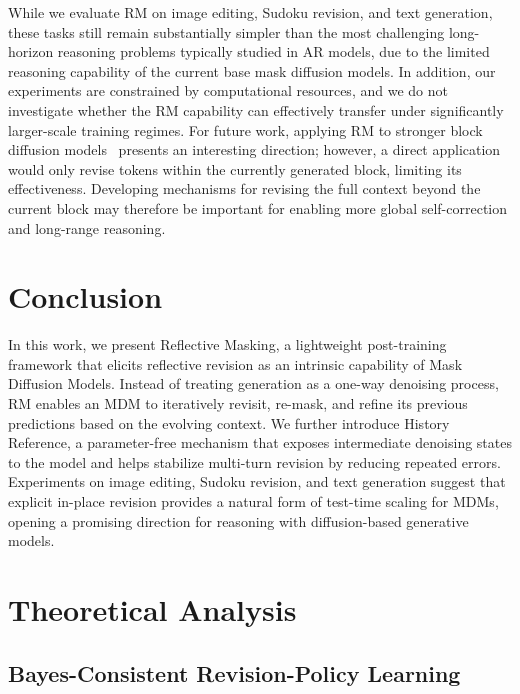 \documentclass{llmxive}
\providecommand{\methodfull}{Reflective Masking\xspace}
\providecommand{\method}{RM\xspace}
\begin{document}
While we evaluate \method on image editing, Sudoku revision, and text generation, these tasks still remain substantially simpler than the most challenging long-horizon reasoning problems typically studied in AR models, due to the limited reasoning capability of the current base mask diffusion models. In addition, our experiments are constrained by computational resources, and we do not investigate whether the \method capability can effectively transfer under significantly larger-scale training regimes. For future work, applying \method to stronger block diffusion models~\citep{arriola2025block,cheng2025sdar,bie2025llada2} presents an interesting direction; however, a direct application would only revise tokens within the currently generated block, limiting its effectiveness. Developing mechanisms for revising the full context beyond the current block may therefore be important for enabling more global self-correction and long-range reasoning.

\section{Conclusion}
\label{sec:conclusion}

In this work, we present \methodfull, a lightweight post-training framework that elicits reflective revision as an intrinsic capability of Mask Diffusion Models. Instead of treating generation as a one-way denoising process, \method enables an MDM to iteratively revisit, re-mask, and refine its previous predictions based on the evolving context. We further introduce History Reference, a parameter-free mechanism that exposes intermediate denoising states to the model and helps stabilize multi-turn revision by reducing repeated errors. Experiments on image editing, Sudoku revision, and text generation suggest that explicit in-place revision provides a natural form of test-time scaling for MDMs, opening a promising direction for reasoning with diffusion-based generative models.





\appendix

\section{Theoretical Analysis}
\label{app:theory}

\subsection{Bayes-Consistent Revision-Policy Learning}
\label{app:bayes-consistency}
\end{document}
